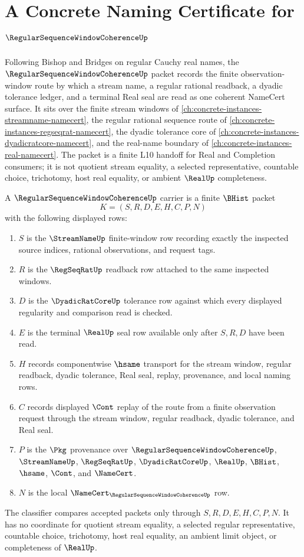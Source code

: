 \chapter{A Concrete Naming Certificate for $\RegularSequenceWindowCoherenceUp$}
\label{ch:concrete-instances-regular-sequence-window-coherence-namecert}

Following Bishop and Bridges on regular Cauchy real names, the $\RegularSequenceWindowCoherenceUp$ packet records the finite observation-window route by which a stream name, a regular rational readback, a dyadic tolerance ledger, and a terminal Real seal are read as one coherent NameCert surface. It sits over the finite stream windows of \autoref{ch:concrete-instances-streamname-namecert}, the regular rational sequence route of \autoref{ch:concrete-instances-regseqrat-namecert}, the dyadic tolerance core of \autoref{ch:concrete-instances-dyadicratcore-namecert}, and the real-name boundary of \autoref{ch:concrete-instances-real-namecert}. The packet is a finite L10 handoff for Real and Completion consumers; it is not quotient stream equality, a selected representative, countable choice, trichotomy, host real equality, or ambient $\RealUp$ completeness.

\begin{definition}
\label{def:regular-sequence-window-coherence-carrier}
A $\RegularSequenceWindowCoherenceUp$ carrier is a finite $\BHist$ packet
$$
K=(S,R,D,E,H,C,P,N)
$$
with the following displayed rows:
\begin{enumerate}
\item $S$ is the $\StreamNameUp$ finite-window row recording exactly the inspected source indices, rational observations, and request tags.
\item $R$ is the $\RegSeqRatUp$ readback row attached to the same inspected windows.
\item $D$ is the $\DyadicRatCoreUp$ tolerance row against which every displayed regularity and comparison read is checked.
\item $E$ is the terminal $\RealUp$ seal row available only after $S,R,D$ have been read.
\item $H$ records componentwise $\hsame$ transport for the stream window, regular readback, dyadic tolerance, Real seal, replay, provenance, and local naming rows.
\item $C$ records displayed $\Cont$ replay of the route from a finite observation request through the stream window, regular readback, dyadic tolerance, and Real seal.
\item $P$ is the $\Pkg$ provenance over $\RegularSequenceWindowCoherenceUp$, $\StreamNameUp$, $\RegSeqRatUp$, $\DyadicRatCoreUp$, $\RealUp$, $\BHist$, $\hsame$, $\Cont$, and $\NameCert$.
\item $N$ is the local $\NameCert_{\RegularSequenceWindowCoherenceUp}$ row.
\end{enumerate}
The classifier compares accepted packets only through $S,R,D,E,H,C,P,N$. It has no coordinate for quotient stream equality, a selected regular representative, countable choice, trichotomy, host real equality, an ambient limit object, or completeness of $\RealUp$.
\end{definition}

